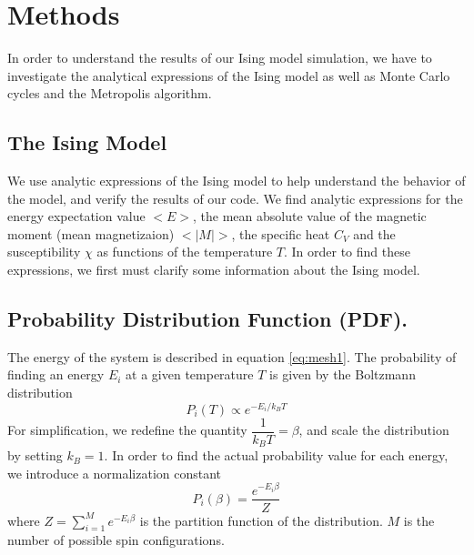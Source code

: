 \documentclass[a4paper]{article}
\begin{document}
\section{Methods}\label{methods}
In order to understand the results of our Ising model simulation, we have to investigate the analytical expressions of the Ising model as well as Monte Carlo cycles and the Metropolis algorithm.
\subsection{The Ising Model}\label{ising}
We use analytic expressions of the Ising model to help understand the behavior of the model, and verify the results of our code. We find analytic expressions for the energy expectation value $<E>$, the mean absolute value of the magnetic moment (mean magnetizaion) $<|M|>$, the specific heat $C_V$ and the susceptibility $\chi$ as functions of the temperature $T$. In order to find these expressions, we first must clarify some information about the Ising model.\\

\subsection{Probability Distribution Function (PDF).}
The energy of the system is described in equation \ref{eq:mesh1}. The probability of finding an energy $E_i$ at a given temperature $T$ is given by the Boltzmann distribution
\begin{equation}
P_i(T) \propto e^{-E_i/k_BT}
\end{equation}
For simplification, we redefine the quantity $\dfrac{1}{k_BT} = \beta$, and scale the distribution by setting $k_B=1$. In order to find the actual probability value for each energy, we introduce a normalization constant
\begin{equation}\label{eq:boltz}
P_i(\beta) = \dfrac{e^{-E_i\beta}}{Z}
\end{equation}
where $Z = \sum_{i=1}^Me^{-E_i\beta}$ is the partition function of the distribution. $M$ is the number of possible spin configurations.\\
\end{document}
